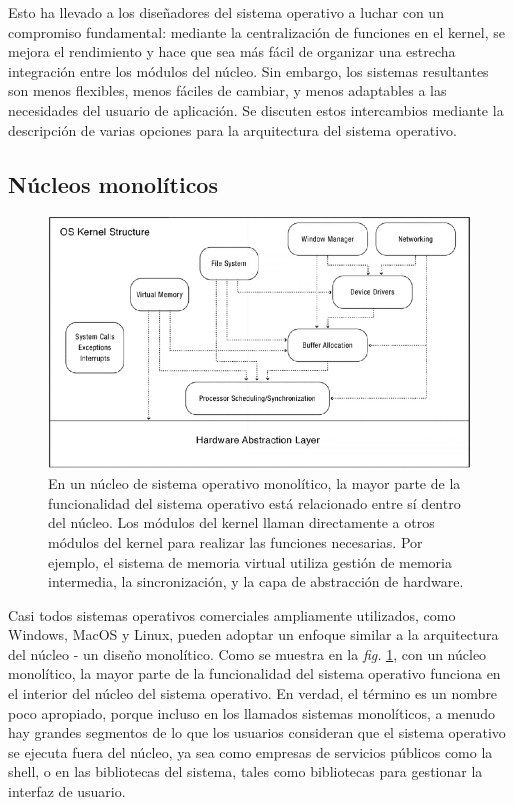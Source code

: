 \documentclass[10pt]{book}
\begin{document}
Esto ha llevado a los diseñadores del sistema operativo a luchar con un compromiso fundamental: mediante la centralización de funciones en el kernel, se mejora el rendimiento y hace que sea más fácil de organizar una estrecha integración entre los módulos del núcleo. Sin embargo, los sistemas resultantes son menos flexibles, menos fáciles de cambiar, y menos adaptables a las necesidades del usuario de aplicación. Se discuten estos intercambios mediante la descripción de varias opciones para la arquitectura del sistema operativo.

\subsection{Núcleos monolíticos}
\begin{figure}[tbhp]
\centerline{\includegraphics[scale=0.45]{img/fig14}}
\caption{En un núcleo de sistema operativo monolítico, la mayor parte de la funcionalidad del sistema operativo está relacionado entre sí dentro del núcleo. Los módulos del kernel llaman directamente a otros módulos del kernel para realizar las funciones necesarias. Por ejemplo, el sistema de memoria virtual utiliza gestión de memoria intermedia, la sincronización, y la capa de abstracción de hardware.}
\label{fig14}
\end{figure}

Casi todos sistemas operativos comerciales ampliamente utilizados, como Windows, MacOS y Linux, pueden adoptar un enfoque similar a la arquitectura del núcleo - un diseño monolítico. Como se muestra en la \textit{fig.} \ref{fig14}, con un núcleo monolítico, la mayor parte de la funcionalidad del sistema operativo funciona en el interior del núcleo del sistema operativo. En verdad, el término es un nombre poco apropiado, porque incluso en los llamados sistemas monolíticos, a menudo hay grandes segmentos de lo que los usuarios consideran que el sistema operativo se ejecuta fuera del núcleo, ya sea como empresas de servicios públicos como la shell, o en las bibliotecas del sistema, tales como bibliotecas para gestionar la interfaz de usuario.
\end{document}
